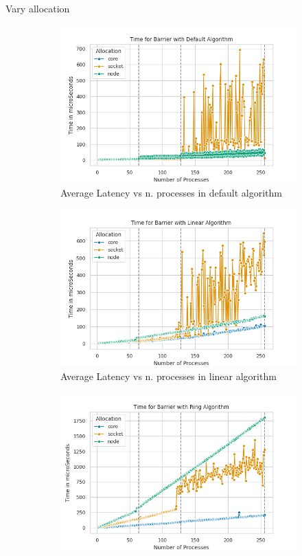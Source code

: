 \documentclass[11pt]{beamer}
\begin{document}
\begin{frame}{Vary allocation}
	\begin{figure}[h]
		\centering
		\begin{subfigure}{0.45\textwidth}
			\centering
			\includegraphics[width=0.7\linewidth]{../exercise1/plots/barrier_default}
			\caption{Average Latency vs n. processes in default algorithm}
			\label{fig:barrierdefault}
		\end{subfigure}
		\begin{subfigure}{0.45\textwidth}
			\centering
			\includegraphics[width=0.7\linewidth]{../exercise1/plots/barrier_linear}
			\caption{Average Latency vs n. processes in linear algorithm}
			\label{fig:barrierlinear}
		\end{subfigure}
		\begin{subfigure}{0.45\textwidth}
			\centering
			\includegraphics[width=0.7\linewidth]{../exercise1/plots/barrier_ring}

\end{subfigure}
\end{figure}
\end{frame}
\end{document}
